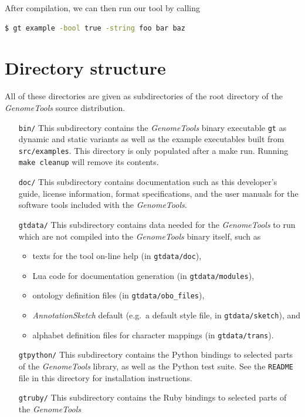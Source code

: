 \documentclass[11pt,final]{article}
\newcommand{\Gt}[0]{\emph{GenomeTools}\xspace}
\begin{document}
After compilation, we can then run our tool by calling

\begin{lstlisting}[language=sh]
$ gt example -bool true -string foo bar baz
\end{lstlisting}%

\section{Directory structure}
All of these directories are given as subdirectories of the root directory of
the \Gt source distribution.
\begin{itemize}
\item[\texttt{bin/}] This subdirectory contains the \Gt binary executable \texttt{gt}
     as dynamic and static variants as well as the example executables built
     from \texttt{src/examples}. This directory is only populated after a
     make run. Running \texttt{make cleanup} will remove its contents.
\item[\texttt{doc/}] This subdirectory contains documentation such as this
     developer's guide, license information, format specifications, and the
     user manuals for the software tools included with the \Gt .
\item[\texttt{gtdata/}]
     This subdirectory contains data needed for the \Gt to run which are not
     compiled into the \Gt binary itself, such as
     \begin{itemize}
       \item texts for the tool on-line help (in \texttt{gtdata/doc}),
       \item Lua code for documentation generation (in \texttt{gtdata/modules}),
       \item ontology definition files (in \texttt{gtdata/obo\_files}),
       \item \emph{AnnotationSketch} default (e.g.\ a default style file, in
              \texttt{gtdata/sketch}), and
       \item alphabet definition files for character mappings
             (in \texttt{gtdata/trans}).
     \end{itemize}
\item[\texttt{gtpython/}]
     This subdirectory contains the Python bindings to selected parts of the \Gt
     library, as well as the Python test suite. See the \texttt{README} file in
     this directory for installation instructions.
\item[\texttt{gtruby/}]
     This subdirectory contains the Ruby bindings to selected parts of the \Gt

\end{itemize}
\end{document}

